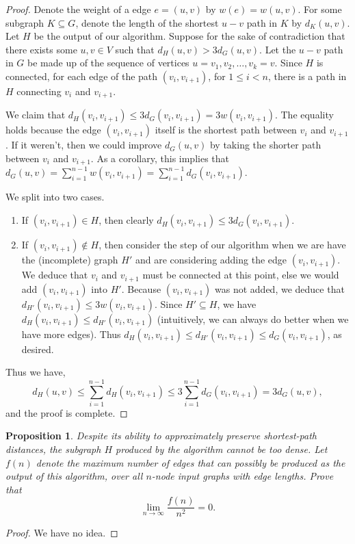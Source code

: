 \documentclass[10pt]{article}
\newtheorem{proposition}[lemma]{Proposition}
\begin{document}
\begin{proof}
  Denote the weight of a edge \(e = (u, v)\) by \(w(e) = w(u, v)\). For some subgraph \(K \subseteq G\), denote the length of the shortest \(u - v\) path in \(K\) by \(d_K(u, v)\). Let \(H\) be the output of our algorithm. Suppose for the sake of contradiction that there exists some \(u, v \in V\) such that \(d_H(u, v) > 3 d_G(u, v)\). Let the \(u - v\) path in \(G\) be made up of the sequence of vertices \(u = v_1, v_2, \dots, v_k = v\). Since \(H\) is connected, for each edge of the path \((v_i, v_{i+1})\), for \(1 \leq i < n\), there is a path in \(H\) connecting \(v_i\) and \(v_{i + 1}\). 

  We claim that \(d_H(v_i, v_{i + 1}) \leq 3 d_G(v_i, v_{i + 1}) = 3 w(v_i, v_{i + 1})\). The equality holds because the edge \((v_i, v_{i + 1})\) itself is the shortest path between \(v_i\) and \(v_{i+1}\). If it weren't, then we could improve \(d_G(u, v)\) by taking the shorter path between \(v_i\) and \(v_{i + 1}\). As a corollary, this implies that \(d_G(u, v) = \sum_{i = 1}^{n - 1} w(v_i, v_{i + 1}) = \sum_{i = 1}^{n - 1} d_G(v_i, v_{i + 1})\).
  
  We split into two cases. 
  \begin{enumerate}
    \item If \((v_i, v_{i + 1}) \in H\), then clearly \(d_H(v_i, v_{i + 1}) \leq 3 d_G(v_i, v_{i + 1})\).
    \item If \((v_i, v_{i + 1}) \notin H\), then consider the step of our algorithm when we are have the (incomplete) graph \(H'\) and are considering adding the edge \((v_i, v_{i + 1})\). We deduce that \(v_i\) and \(v_{i + 1}\) must be connected at this point, else we would add \((v_i, v_{i+1})\) into \(H'\). Because \((v_i, v_{i + 1})\) was not added, we deduce that \(d_{H'}(v_i, v_{i + 1}) \le  3 w(v_i, v_{i + 1})\). Since \(H' \subseteq H\), we have \(d_{H}(v_i, v_{i + 1}) \le d_{H'}(v_i, v_{i + 1})\) (intuitively, we can always do better when we have more edges). Thus \(d_{H}(v_i, v_{i + 1}) \le d_{H'}(v_i, v_{i + 1}) \le d_{G}(v_i, v_{i + 1})\), as desired.
  \end{enumerate}

  Thus we have,
  \[d_H(u, v) \le \sum_{i = 1}^{n - 1}d_H(v_i, v_{i + 1}) \le 3 \sum_{i = 1}^{n - 1} d_G(v_i, v_{i + 1}) = 3 d_G(u, v),\]
  and the proof is complete.
\end{proof}

\begin{proposition}
  Despite its ability to approximately preserve shortest-path distances, the subgraph \(H\) produced by the algorithm cannot be too dense. Let \(f(n)\) denote the maximum number of edges that can possibly be produced as the output of this algorithm, over all \(n\)-node input graphs with edge lengths. Prove that
  \[\lim_{n \to \infty} \frac{f(n)}{n^2} = 0.\]
\end{proposition}

\begin{proof}
  We have no idea. 
\end{proof}
\end{document}
